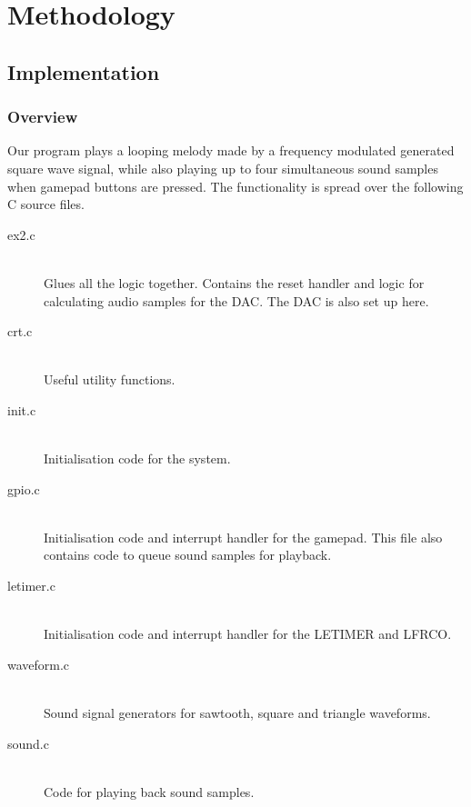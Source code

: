 \chapter{Methodology}

\section{Implementation}

\subsection{Overview}

Our program plays a looping melody made by a frequency modulated generated
square wave signal, while also playing up to four simultaneous sound samples
when gamepad buttons are pressed. The functionality is spread over the following
C source files.

\begin{description}
\item[ex2.c] \hfill \\
	Glues all the logic together. Contains the reset handler and logic for
	calculating audio samples for the DAC. The DAC is also set up here.
\item[crt.c] \hfill \\
	Useful utility functions.
\item[init.c] \hfill \\
	Initialisation code for the system.
\item[gpio.c] \hfill \\
	Initialisation code and interrupt handler for the gamepad. This file also
	contains code to queue sound samples for playback.
\item[letimer.c] \hfill \\
	Initialisation code and interrupt handler for the LETIMER and LFRCO.
\item[waveform.c] \hfill \\
	Sound signal generators for sawtooth, square and triangle waveforms.
\item[sound.c] \hfill \\
	Code for playing back sound samples.
\end{description}

